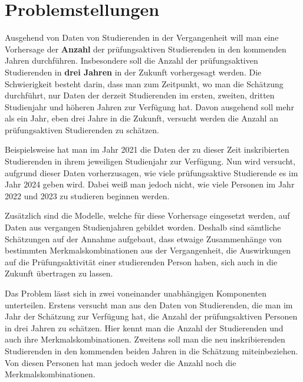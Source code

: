 


\section{Problemstellungen}

Ausgehend von Daten von Studierenden in der Vergangenheit will man eine Vorhersage der \textbf{Anzahl} der prüfungsaktiven Studierenden in den kommenden
Jahren durchf\"uhren. Insbesondere soll die Anzahl der pr\"ufungsaktiven Studierenden in \textbf{drei Jahren} in der Zukunft vorhergesagt werden.
Die Schwierigkeit besteht darin, dass man zum Zeitpunkt, wo man die Schätzung durchf\"uhrt, nur Daten der derzeit Studierenden im ersten, zweiten, dritten Studienjahr
und h\"oheren Jahren zur Verfügung hat.
Davon ausgehend soll mehr als ein Jahr, eben drei Jahre in die Zukunft, versucht werden die Anzahl an prüfungsaktiven Studierenden zu schätzen.

Beispielsweise hat man im Jahr 2021 die Daten der zu dieser Zeit inskribierten Studierenden in ihrem jeweiligen Studienjahr zur Verf\"ugung. Nun wird versucht, aufgrund dieser Daten
vorherzusagen, wie viele pr\"ufungsaktive Studierende es im Jahr 2024 geben wird. Dabei wei{\ss} man jedoch nicht, wie viele Personen im Jahr 2022 und 2023 zu studieren
beginnen werden.

Zus\"atzlich sind die Modelle, welche f\"ur diese Vorhersage eingesetzt werden, auf Daten aus vergangen Studienjahren gebildet worden.
Deshalb sind s\"amtliche Sch\"atzungen auf der Annahme aufgebaut, dass etwaige Zusammenh\"ange von bestimmten Merkmalskombinationen aus der Vergangenheit,
die Auswirkungen auf die Pr\"ufungsaktivit\"at einer studierenden Person haben, sich auch in die Zukunft \"ubertragen zu lassen.

Das Problem l\"asst sich in zwei voneinander unabh\"angigen Komponenten unterteilen. Erstens versucht man aus den Daten von Studierenden, die man im Jahr
der Sch\"atzung zur Verf\"ugung hat, die Anzahl der pr\"ufungsaktiven Personen in drei Jahren zu sch\"atzen. Hier kennt man die Anzahl der Studierenden und auch ihre
Merkmalskombinationen. Zweitens soll man die neu inskribierenden Studierenden in den kommenden beiden Jahren in die Sch\"atzung miteinbeziehen. Von diesen Personen
hat man jedoch weder die Anzahl noch die Merkmalskombinationen.

